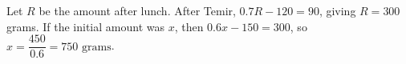 Let $R$ be the amount after lunch. After Temir, $0.7R-120=90$, giving $R=300$ grams. If the initial amount was $x$, then $0.6x-150=300$, so $x=\dfrac{450}{0.6}=\boxed{750\text{ grams}}$.
